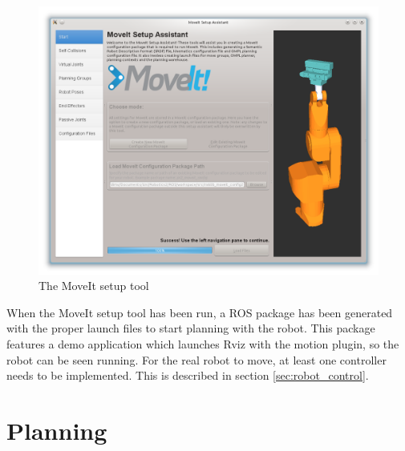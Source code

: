 \begin{figure}[htb]
	\begin{center}
		\includegraphics[scale=0.4,trim=0 0 0 0]{graphics/05_robotics/moveit_setup_assistant.png}%
		\caption{The MoveIt setup tool}
		\label{fig:moveit_setup_assistant}
	\end{center}
\end{figure}

When the MoveIt setup tool has been run, a ROS package has been generated with the proper launch files to start planning with the robot. This package features a demo application which launches Rviz with the motion plugin, so the robot can be seen running. For the real robot to move, at least one controller needs to be implemented. This is described in section \ref{sec:robot_control}.




\section{Planning}
\label{sec:planning}

